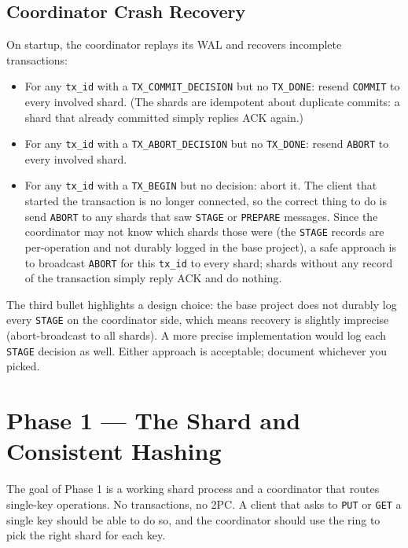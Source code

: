 \documentclass[11pt,a4paper]{article}
\begin{document}
\subsection{Coordinator Crash Recovery}
On startup, the coordinator replays its WAL and recovers incomplete transactions:

\begin{itemize}
\item For any \texttt{tx\_id} with a \texttt{TX\_COMMIT\_DECISION} but no \texttt{TX\_DONE}: resend \texttt{COMMIT} to every involved shard. (The shards are idempotent about duplicate commits: a shard that already committed simply replies ACK again.)

\item For any \texttt{tx\_id} with a \texttt{TX\_ABORT\_DECISION} but no \texttt{TX\_DONE}: resend \texttt{ABORT} to every involved shard.

\item For any \texttt{tx\_id} with a \texttt{TX\_BEGIN} but no decision: abort it. The client that started the transaction is no longer connected, so the correct thing to do is send \texttt{ABORT} to any shards that saw \texttt{STAGE} or \texttt{PREPARE} messages. Since the coordinator may not know which shards those were (the \texttt{STAGE} records are per-operation and not durably logged in the base project), a safe approach is to broadcast \texttt{ABORT} for this \texttt{tx\_id} to every shard; shards without any record of the transaction simply reply ACK and do nothing.
\end{itemize}

The third bullet highlights a design choice: the base project does not durably log every \texttt{STAGE} on the coordinator side, which means recovery is slightly imprecise (abort-broadcast to all shards). A more precise implementation would log each \texttt{STAGE} decision as well. Either approach is acceptable; document whichever you picked.

\section{Phase 1 --- The Shard and Consistent Hashing}

The goal of Phase 1 is a working shard process and a coordinator that routes single-key operations. No transactions, no 2PC. A client that asks to \texttt{PUT} or \texttt{GET} a single key should be able to do so, and the coordinator should use the ring to pick the right shard for each key.
\end{document}
